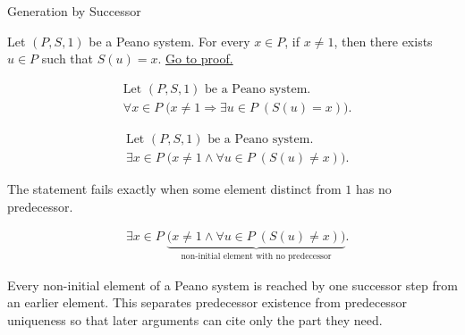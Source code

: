 \begin{topicbox}{Generation by Successor}
\begin{tcolorbox}[colback=corbox, colframe=corborder, arc=2pt,
  left=6pt, right=6pt, top=4pt, bottom=4pt,
  title={\small\textbf{Corollary (Non-One Elements Have a Predecessor)}} ,
  fonttitle=\small\bfseries]
\begin{corollary}
\label{cor:non-one-elements-have-a-predecessor}
Let $(P,S,1)$ be a Peano system. For every $x \in P$, if $x \neq 1$, then
there exists $u \in P$ such that $S(u)=x$.
\hyperref[prf:non-one-elements-have-a-predecessor]{Go to proof.}
\end{corollary}
\end{tcolorbox}

\begin{remark*}
\[
\begin{aligned}
&\text{Let } (P,S,1) \text{ be a Peano system.}\\
&\forall x \in P\;\bigl(x\neq 1 \Longrightarrow
\exists u \in P\;(S(u)=x)\bigr).
\end{aligned}
\]
\end{remark*}

\begin{remark*}
\[
\begin{aligned}
&\text{Let } (P,S,1) \text{ be a Peano system.}\\
&\exists x \in P\;\bigl(x\neq 1 \land
\forall u \in P\;(S(u)\neq x)\bigr).
\end{aligned}
\]
\end{remark*}

\begin{remark*}
The statement fails exactly when some element distinct from $1$ has no
predecessor.
\end{remark*}

\begin{remark*}
\[
\begin{aligned}
&\exists x \in P\;
\underbrace{\bigl(x\neq 1 \land
\forall u \in P\;(S(u)\neq x)\bigr)}_{\text{non-initial element with no predecessor}}.
\end{aligned}
\]
\end{remark*}

\begin{remark*}[Interpretation]
Every non-initial element of a Peano system is reached by one successor step
from an earlier element. This separates predecessor existence from predecessor
uniqueness so that later arguments can cite only the part they need.
\end{remark*}


\end{topicbox}
